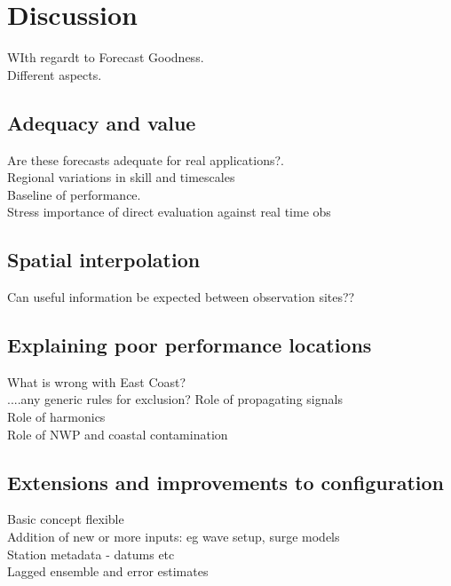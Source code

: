 \documentclass[jmse,article,submit,moreauthors,pdftex,10pt,a4paper]{mdpi}
\begin{document}



\section{Discussion}

WIth regardt to Forecast Goodness.\\
Different aspects.


\subsection{Adequacy and value}
Are these forecasts adequate for real applications?.\\
Regional variations in skill and timescales\\
Baseline of performance.\\
Stress importance of direct evaluation against real time obs\\

\subsection{Spatial interpolation}
Can useful information be expected between observation sites??


\subsection{Explaining poor performance locations}
What is wrong with East Coast?\\
....any generic rules for exclusion?
Role of propagating signals\\
Role of harmonics\\
Role of NWP and coastal contamination\\

\subsection{Extensions and improvements to configuration}
Basic concept flexible\\
Addition of new or more inputs: eg wave setup, surge models\\
Station metadata - datums etc\\
Lagged ensemble and error estimates \\
\end{document}

